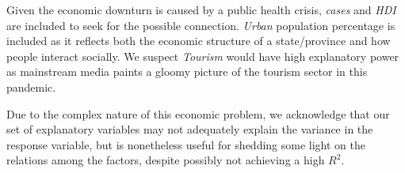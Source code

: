 \documentclass{article}
\begin{document}
Given the economic downturn is caused by a public health crisis, \textit{cases} and \textit{HDI} are included to seek for the possible connection. \textit{Urban} population percentage is included as it reflects both the economic structure of a state/province and how people interact socially. We suspect \textit{Tourism} would have high explanatory power as mainstream media paints a gloomy picture of the tourism sector in this pandemic. 

Due to the complex nature of this economic problem, we acknowledge that our set of explanatory variables may not adequately explain the variance in the response variable, but is nonetheless useful for shedding some light on the relations among the factors, despite possibly not achieving a high $R^2$. \\
\end{document}
